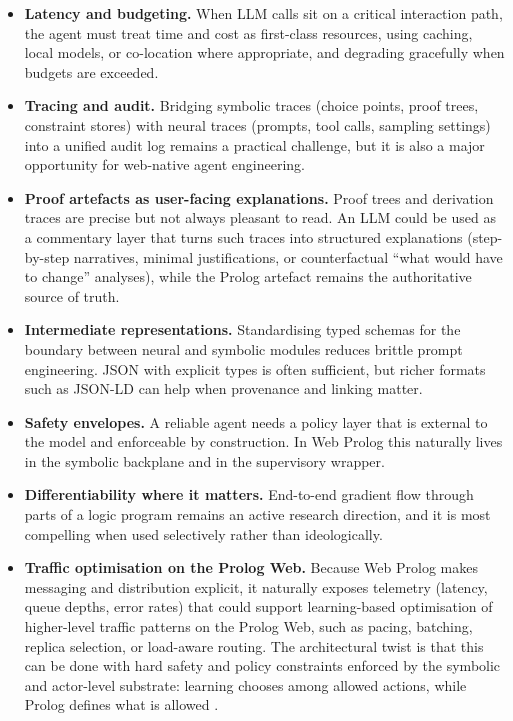 \begin{itemize}
\item \textbf{Latency and budgeting.} When LLM calls sit on a critical interaction path, the agent must treat time and cost as first-class resources, using caching, local models, or co-location where appropriate, and degrading gracefully when budgets are exceeded.
\item \textbf{Tracing and audit.} Bridging symbolic traces (choice points, proof trees, constraint stores) with neural traces (prompts, tool calls, sampling settings) into a unified audit log remains a practical challenge, but it is also a major opportunity for web-native agent engineering.
\item \textbf{Proof artefacts as user-facing explanations.} Proof trees and derivation traces are precise but not always pleasant to read. An LLM could be used as a commentary layer that turns such traces into structured explanations (step-by-step narratives, minimal justifications, or counterfactual ``what would have to change'' analyses), while the Prolog artefact remains the authoritative source of truth.
\item \textbf{Intermediate representations.} Standardising typed schemas for the boundary between neural and symbolic modules reduces brittle prompt engineering. JSON with explicit types is often sufficient, but richer formats such as JSON-LD can help when provenance and linking matter.
\item \textbf{Safety envelopes.} A reliable agent needs a policy layer that is external to the model and enforceable by construction. In Web Prolog this naturally lives in the symbolic backplane and in the supervisory wrapper.
\item \textbf{Differentiability where it matters.} End-to-end gradient flow through parts of a logic program remains an active research direction, and it is most compelling when used selectively rather than ideologically.
\item \textbf{Traffic optimisation on the Prolog Web.} Because Web Prolog makes messaging and distribution explicit, it naturally exposes telemetry (latency, queue depths, error rates) that could support learning-based optimisation of higher-level traffic patterns on the Prolog Web, such as pacing, batching, replica selection, or load-aware routing. The architectural twist is that this can be done with hard safety and policy constraints enforced by the symbolic and actor-level substrate: learning chooses among allowed actions, while Prolog defines what is allowed \cite{Jay2019Deep,Xu2023Teal}.
\end{itemize}

